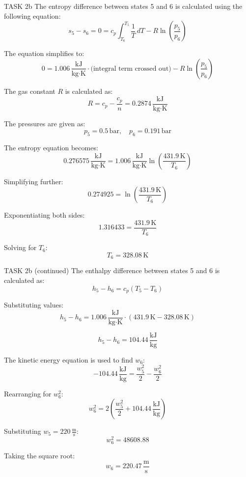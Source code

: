TASK 2b  
The entropy difference between states 5 and 6 is calculated using the following equation:  
\[
s_5 - s_6 = 0 = c_p \int_{T_6}^{T_5} \frac{1}{T} \, dT - R \ln \left( \frac{p_5}{p_6} \right)
\]  

The equation simplifies to:  
\[
0 = 1.006 \, \frac{\text{kJ}}{\text{kg·K}} \cdot \text{(integral term crossed out)} - R \ln \left( \frac{p_5}{p_6} \right)
\]  

The gas constant \( R \) is calculated as:  
\[
R = c_p - \frac{c_p}{n} = 0.2874 \, \frac{\text{kJ}}{\text{kg·K}}
\]  

The pressures are given as:  
\[
p_5 = 0.5 \, \text{bar}, \quad p_6 = 0.191 \, \text{bar}
\]  

The entropy equation becomes:  
\[
0.276575 \, \frac{\text{kJ}}{\text{kg·K}} = 1.006 \, \frac{\text{kJ}}{\text{kg·K}} \ln \left( \frac{431.9 \, \text{K}}{T_6} \right)
\]  

Simplifying further:  
\[
0.274925 = \ln \left( \frac{431.9 \, \text{K}}{T_6} \right)
\]  

Exponentiating both sides:  
\[
1.316433 = \frac{431.9 \, \text{K}}{T_6}
\]  

Solving for \( T_6 \):  
\[
T_6 = 328.08 \, \text{K}
\]  

TASK 2b (continued)  
The enthalpy difference between states 5 and 6 is calculated as:  
\[
h_5 - h_6 = c_p (T_5 - T_6)
\]  

Substituting values:  
\[
h_5 - h_6 = 1.006 \, \frac{\text{kJ}}{\text{kg·K}} \cdot (431.9 \, \text{K} - 328.08 \, \text{K})
\]  

\[
h_5 - h_6 = 104.44 \, \frac{\text{kJ}}{\text{kg}}
\]  

The kinetic energy equation is used to find \( w_6 \):  
\[
-104.44 \, \frac{\text{kJ}}{\text{kg}} = \frac{w_5^2}{2} - \frac{w_6^2}{2}
\]  

Rearranging for \( w_6^2 \):  
\[
w_6^2 = 2 \left( \frac{w_5^2}{2} + 104.44 \, \frac{\text{kJ}}{\text{kg}} \right)
\]  

Substituting \( w_5 = 220 \, \frac{\text{m}}{\text{s}} \):  
\[
w_6^2 = 48608.88
\]  

Taking the square root:  
\[
w_6 = 220.47 \, \frac{\text{m}}{\text{s}}
\]